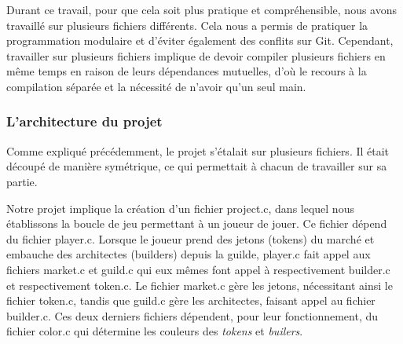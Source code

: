 \documentclass{article}
\begin{document}
\hspace{1em}Durant ce travail, pour que cela soit plus pratique et compréhensible, nous avons travaillé sur plusieurs fichiers différents. Cela nous a permis de pratiquer la programmation modulaire et d'éviter également des conflits sur Git. Cependant, travailler sur plusieurs fichiers implique de devoir compiler plusieurs fichiers en même temps en raison de leurs dépendances mutuelles, d'où le recours à la compilation séparée et la nécessité de n'avoir qu'un seul main. 

\subsubsection{L'architecture du projet}
 
\hspace{1em}Comme expliqué précédemment, le projet s'étalait sur plusieurs fichiers. Il était découpé de manière symétrique, ce qui permettait à chacun de travailler sur sa partie.

\hspace{1em}


\begin{minipage}{0.6\textwidth} \label{schema}
\end{minipage}
\begin{minipage}{0.4\textwidth}

Notre projet implique la création d'un fichier project.c, dans lequel nous établissons la boucle de jeu permettant à un joueur de jouer. Ce fichier dépend du fichier player.c. Lorsque le joueur prend des jetons (tokens) du marché et embauche des architectes (builders) depuis la guilde, player.c fait appel aux fichiers market.c et guild.c qui eux mêmes font appel à respectivement builder.c et respectivement token.c. Le fichier market.c gère les jetons, nécessitant ainsi le fichier token.c, tandis que guild.c gère les architectes, faisant appel au fichier builder.c. Ces deux derniers fichiers dépendent, pour leur fonctionnement, du fichier color.c qui détermine les couleurs des \emph{tokens} et \emph{builers}.




\end{minipage}
\end{document}
